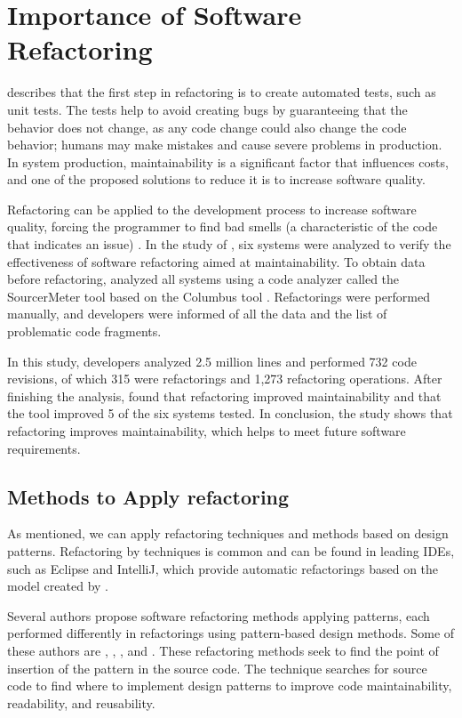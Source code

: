 \section{Importance of Software Refactoring}
\label{sec-importance}
\textcite{fowler2018refactoring} describes that the first step in refactoring is to create automated tests, such as unit tests. The tests help to avoid creating bugs by guaranteeing that the behavior does not change, as any code change could also change the code behavior; humans may make mistakes and cause severe problems in production. In system production, maintainability is a significant factor that influences costs, and one of the proposed solutions to reduce it is to increase software quality. 

Refactoring can be applied to the development process to increase software quality, forcing the programmer to find bad smells (a characteristic of the code that indicates an issue) \cite{Wilking2007}. 
In the study of \textcite{szHoke2017empirical}, six systems were analyzed to verify the effectiveness of software refactoring aimed at maintainability. To obtain data before refactoring, \textcite{szHoke2017empirical} analyzed all systems using a code analyzer called the SourcerMeter tool based on the Columbus tool \cite{ferenc2002}. Refactorings were performed manually, and developers were informed of all the data and the list of problematic code fragments. 

In this study, developers analyzed 2.5 million lines and performed 732 code revisions, of which 315 were refactorings and 1,273 refactoring operations. After finishing the analysis, \textcite{szHoke2017empirical} found that refactoring improved maintainability and that the tool improved 5 of the six systems tested. In conclusion, the study shows that refactoring improves maintainability, which helps to meet future software requirements.

\subsection{Methods to Apply refactoring}
\label{sub-methods}
As mentioned, we can apply refactoring techniques and methods based on design patterns. Refactoring by techniques is common and can be found in leading IDEs, such as Eclipse and IntelliJ, which provide automatic refactorings based on the model created by \textcite{fowler2018refactoring}. 

Several authors propose software refactoring methods applying patterns, each performed differently in refactorings using pattern-based design methods. Some of these authors are \textcite{liu2014automated}, \textcite{zafeiris2017automated}, \textcite{cinneide2000automated}, and \cite{ouni2017more}. 
These refactoring methods seek to find the point of insertion of the pattern in the source code. The technique searches for source code to find where to implement design patterns to improve code maintainability, readability, and reusability. 

